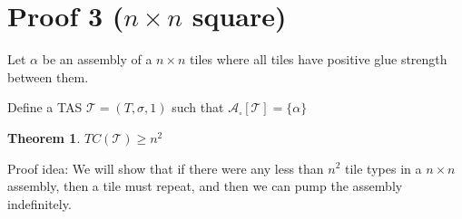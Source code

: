 \documentclass[12pt]{article}
\newtheorem{theorem}{Theorem}
\begin{document}
\section*{Proof 3 ($n \times n$ square)}

Let $\alpha$ be an assembly of a $n \times n$ tiles where all tiles have positive glue strength between them.

Define a TAS $\mathcal{T} = (T, \sigma, 1)$ such that $\mathcal{A}_\square[\mathcal{T}] = \{ \alpha \}$


\begin{theorem}
	$TC(\mathcal{T}) \geq n^2$
\end{theorem}

Proof idea: We will show that if there were any less than $n^2$ tile types in a $n \times n$ assembly, then a tile must repeat, and then we can pump the assembly indefinitely.
\end{document}
